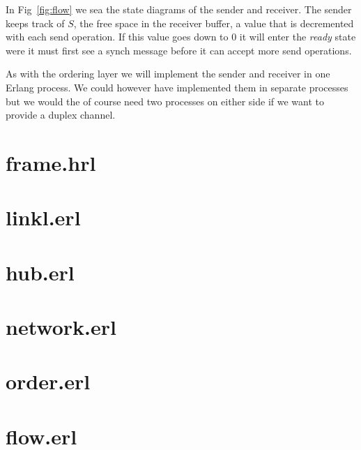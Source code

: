 \documentclass[a4paper,11pt]{article}
\begin{document}
In Fig~\ref{fig:flow} we sea the state diagrams of the sender and
receiver. The sender keeps track of $S$,
the free space in the receiver buffer, a value that is decremented
with each send operation. If this value goes down to $0$
it will enter the {\em ready} state were it must first see a synch
message before it can accept more send operations. 

As with the ordering layer we will implement the sender and receiver
in one Erlang process. We could however have implemented them in
separate processes but we would the of course need two processes on
either side if we want to provide a duplex channel. 



\newpage
\appendix
\section{frame.hrl} \label{app:frame}

\vspace{4cm}
\section{linkl.erl} \label{app:link}

\pagebreak
\section{hub.erl} \label{app:hub}

\pagebreak
\section{network.erl} \label{app:net}

\pagebreak
\section{order.erl} \label{app:ord}

\pagebreak 
\section{flow.erl} \label{app:flow}

\end{document}
